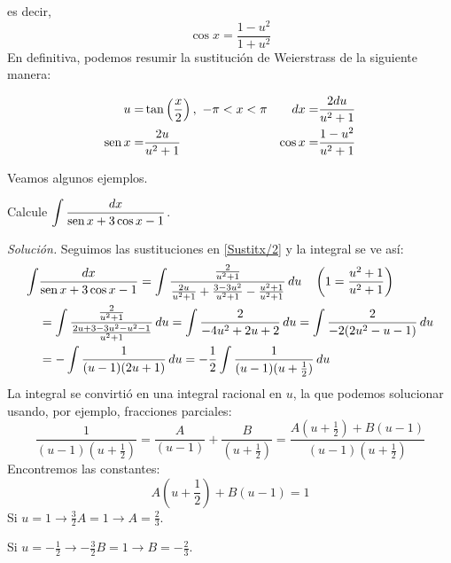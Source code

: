 

es decir,
\begin{equation}\label{Cosenox/2}
\cos x=\frac{1-u^{2}}{1+u^{2}}
\end{equation}
En definitiva, podemos resumir la sustitución de Weierstrass de la siguiente manera:

\begin{align}\label{Sustitx/2}
u= & \tan \left(\frac{x}{2}\right),\ -\pi< x<\pi & dx=& \frac{2du}{u^{2}+1} \\
\sen x= & \frac{2u}{u^{2}+1} & \cos x= & \frac{1-u^{2}}{u^{2}+1}\notag%
\end{align}

Veamos algunos ejemplos.

\begin{ejemplo}
Calcule $\displaystyle\int \frac{dx}{\text{\rm sen}\, x+3\cos x-1}$.
\end{ejemplo}

\textit{Solución.} Seguimos las sustituciones en \eqref{Sustitx/2} y la integral se ve así:
{\small
\begin{align*}
\int& \frac{dx}{\sen x+3\cos x-1}=\int \frac{\frac{2}{u^{2}+1}}{\frac{2u}{u^{2}+1}+\frac{3-3u^{2}}{u^{2}+1}-%
\frac{u^{2}+1}{u^{2}+1}}\, du\quad \left(1=\frac{u^{2}+1}{u^{2}+1}\right) \\
&=\int \frac{\frac{2}{u^{2}+1}}{\frac{2u+3-3u^{2}-u^{2}-1}{u^{2}+1}}\, du%
=\int \frac{2}{-4u^{2}+2u+2}\, du=\int \frac{2}{-2(2u^{2}-u-1)}\, du \\
& %
=-\int \frac{1}{(u-1)(2u+1)}\, du =-\frac{1}{2}\int \frac{1}{(u-1)(u+\frac{1}{2})}\, du
\end{align*}
}
La integral se convirtió en una integral racional en $u$, la que podemos solucionar usando, por ejemplo, fracciones parciales:
{\small
\[
\frac{1}{(u-1)(u+\frac{1}{2})}=\frac{A}{(u-1)}+\frac{B}{(u+\frac{1}{2})}=%
\frac{A(u+\frac{1}{2})+B(u-1)}{(u-1)(u+\frac{1}{2})}
\]
}
Encontremos las constantes:
\[
A\left(u+\frac{1}{2}\right)+B(u-1)=1
\]
Si $u=1\rightarrow \frac{3}{2}A=1\rightarrow A=\frac{2}{3}$.

Si $u=-\frac{1}{2}\rightarrow -\frac{3}{2}B=1\rightarrow B=-\frac{2}{3}$.

